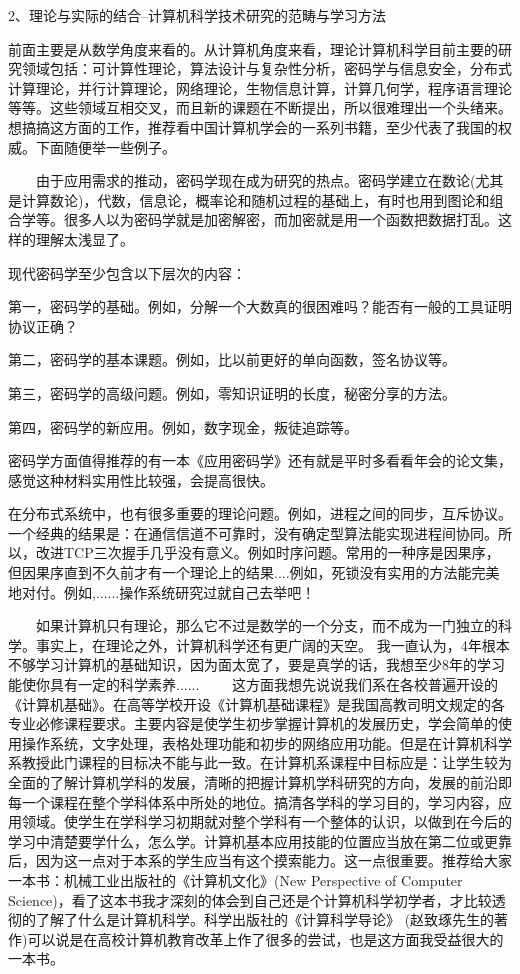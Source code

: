 2、理论与实际的结合--计算机科学技术研究的范畴与学习方法 

前面主要是从数学角度来看的。从计算机角度来看，理论计算机科学目前主要的研究领域包括：可计算性理论，算法设计与复杂性分析，密码学与信息安全，分布式计算理论，并行计算理论，网络理论，生物信息计算，计算几何学，程序语言理论等等。这些领域互相交叉，而且新的课题在不断提出，所以很难理出一个头绪来。想搞搞这方面的工作，推荐看中国计算机学会的一系列书籍，至少代表了我国的权威。下面随便举一些例子。 

　　由于应用需求的推动，密码学现在成为研究的热点。密码学建立在数论(尤其是计算数论)，代数，信息论，概率论和随机过程的基础上，有时也用到图论和组合学等。很多人以为密码学就是加密解密，而加密就是用一个函数把数据打乱。这样的理解太浅显了。

现代密码学至少包含以下层次的内容： 

第一，密码学的基础。例如，分解一个大数真的很困难吗？能否有一般的工具证明协议正确？ 

第二，密码学的基本课题。例如，比以前更好的单向函数，签名协议等。 

第三，密码学的高级问题。例如，零知识证明的长度，秘密分享的方法。 

第四，密码学的新应用。例如，数字现金，叛徒追踪等。 

密码学方面值得推荐的有一本《应用密码学》还有就是平时多看看年会的论文集，感觉这种材料实用性比较强，会提高很快。 

在分布式系统中，也有很多重要的理论问题。例如，进程之间的同步，互斥协议。一个经典的结果是：在通信信道不可靠时，没有确定型算法能实现进程间协同。所以，改进TCP三次握手几乎没有意义。例如时序问题。常用的一种序是因果序，但因果序直到不久前才有一个理论上的结果....例如，死锁没有实用的方法能完美地对付。例如,......操作系统研究过就自己去举吧！ 

　　如果计算机只有理论，那么它不过是数学的一个分支，而不成为一门独立的科学。事实上，在理论之外，计算机科学还有更广阔的天空。 
我一直认为，4年根本不够学习计算机的基础知识，因为面太宽了，要是真学的话，我想至少8年的学习能使你具有一定的科学素养...... 
　　这方面我想先说说我们系在各校普遍开设的《计算机基础》。在高等学校开设《计算机基础课程》是我国高教司明文规定的各专业必修课程要求。主要内容是使学生初步掌握计算机的发展历史，学会简单的使用操作系统，文字处理，表格处理功能和初步的网络应用功能。但是在计算机科学系教授此门课程的目标决不能与此一致。在计算机系课程中目标应是：让学生较为全面的了解计算机学科的发展，清晰的把握计算机学科研究的方向，发展的前沿即每一个课程在整个学科体系中所处的地位。搞清各学科的学习目的，学习内容，应用领域。使学生在学科学习初期就对整个学科有一个整体的认识，以做到在今后的学习中清楚要学什么，怎么学。计算机基本应用技能的位置应当放在第二位或更靠后，因为这一点对于本系的学生应当有这个摸索能力。这一点很重要。推荐给大家一本书：机械工业出版社的《计算机文化》(New Perspective of Computer Science)，看了这本书我才深刻的体会到自己还是个计算机科学初学者，才比较透彻的了解了什么是计算机科学。科学出版社的《计算科学导论》 (赵致琢先生的著作)可以说是在高校计算机教育改革上作了很多的尝试，也是这方面我受益很大的一本书。 

